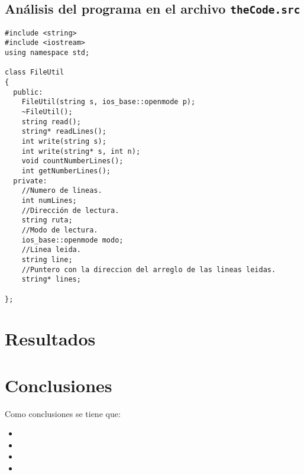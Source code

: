 \subsection{Análisis del programa en el archivo \texttt{theCode.src}}

\begin{verbatim}
#include <string>
#include <iostream>
using namespace std;

class FileUtil
{
  public:
  	FileUtil(string s, ios_base::openmode p);
  	~FileUtil();
  	string read();
  	string* readLines();
  	int write(string s);
  	int write(string* s, int n);
    void countNumberLines();
    int getNumberLines();
  private:
    //Numero de lineas.
    int numLines;
    //Dirección de lectura.
    string ruta;
    //Modo de lectura.
  	ios_base::openmode modo;
    //Linea leida.
    string line;
    //Puntero con la direccion del arreglo de las lineas leidas.
    string* lines;

};
\end{verbatim}



\section{Resultados}



\section{Conclusiones}


Como conclusiones se tiene que:

\begin{itemize}
\item 
\item 
\item 
\item 
\end{itemize}


